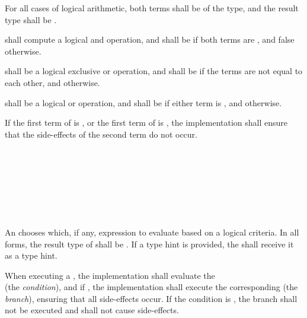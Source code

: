 \specsubsubitem
For all cases of logical arithmetic, both terms shall be of the 
type, and the result type shall be .

\specsubsubitem
\terminal{\&\&} shall compute a logical and operation, and shall be
 if both terms are , and false otherwise.

\specsubsubitem
\terminal{\textasciicircum\textasciicircum} shall be a logical exclusive or
operation, and shall be  if the terms are not equal to each
other, and  otherwise.

\specsubsubitem
\terminal{||} shall be a logical or operation, and shall be  if
either term is , and  otherwise.

\specsubsubitem
If the first term of  is ,
or the first term of  is ,
the implementation shall ensure that the side-effects of the second term do not
occur.


\begin{grammar}
 \\
	  \\
	    \\
	    \\

 \\
	\terminal{(}  \terminal{)}  \\
\end{grammar}

\specsubsubitem
An  chooses which, if any, expression to evaluate
based on a logical criteria. In all forms, the result type of
 shall be . If a type hint is provided,
the  shall receive it as a type hint.

\specsubsubitem
When executing a , the implementation shall
evaluate the \\  (the \textit{condition}), and if
, the implementation shall execute the corresponding
 (the \textit{branch}), ensuring that all side-effects
occur. If the condition is , the branch shall not be executed
and shall not cause side-effects.


